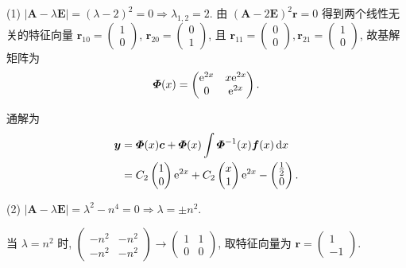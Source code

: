 \begin{solve}
  (1) $|\bm{A}-\lambda\bm{E}|=(\lambda-2)^2=0\Rightarrow\lambda_{1,2}=2$. 
  由 $(\bm{A}-2\bm{E})^2\bm{r}=0$ 得到两个线性无关的特征向量
  $\bm{r}_{10}=\begin{pmatrix}1\\0\end{pmatrix}$,
  $\bm{r}_{20}=\begin{pmatrix}0\\1\end{pmatrix}$, 
  且 $\bm{r}_{11}=\begin{pmatrix}0\\0\end{pmatrix},\bm{r}_{21}=\begin{pmatrix}1\\0\end{pmatrix}$,
  故基解矩阵为
  \[\bm{\varPhi}(x)=\begin{pmatrix}\mathrm{e}^{2x}&x\mathrm{e}^{2x}\\0&\mathrm{e}^{2x}\end{pmatrix}.\]

  通解为
  \begin{align*}
    \bm{y}
    & = \bm{\varPhi}(x)\bm{c}+\bm{\varPhi}(x)\int\bm{\varPhi}^{-1}(x)\bm{f}(x)\mathop{}\!\mathrm{d} x\\
    & = C_2\begin{pmatrix}1\\0\end{pmatrix}\mathrm{e}^{2x}
      + C_2\begin{pmatrix}x\\1\end{pmatrix}\mathrm{e}^{2x}-\begin{pmatrix}\frac{1}{2}\\0\end{pmatrix}.
  \end{align*}

  (2) $|\bm{A}-\lambda\bm{E}|=\lambda^2-n^4=0\Rightarrow\lambda=\pm n^2$.

  当 $\lambda=n^2$ 时, $\begin{pmatrix}-n^2&-n^2\\-n^2&-n^2\end{pmatrix}\to\begin{pmatrix}1&1\\0&0\end{pmatrix}$, 
  取特征向量为 $\bm{r}=\begin{pmatrix}1\\-1\end{pmatrix}$.


\end{solve}
